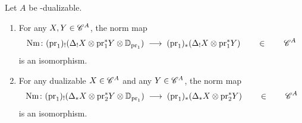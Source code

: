 \documentclass[english,svgnames,table]{article}
\begin{document}
    \begin{lemma}
    \label{lem:induced-tate-is-zero}
        Let $A$ be \COB-dualizable.
        \begin{enumerate}[label=(\arabic*)]
            \item \label{item:induced-tate-pr1}
            For any $X, Y \in \mathscr{C}^A$, the norm map
            \begin{equation*}
                \operatorname{Nm} \colon (\mathrm{pr}_1)_! (\Delta_! X \otimes \mathrm{pr}_1^* Y \otimes \mathbb{D}_{\mathrm{pr}_1}) \;\longrightarrow\; (\mathrm{pr}_1)_* (\Delta_! X \otimes \mathrm{pr}_1^* Y) \qquad \in \qquad \mathscr{C}^{A}
            \end{equation*}
            is an isomorphism.
            \item \label{item:induced-tate-pr2}
            For any dualizable $X \in \mathscr{C}^A$ and any $Y \in \mathscr{C}^A$, the norm map
            \begin{equation*}
                \operatorname{Nm} \colon (\mathrm{pr}_1)_! (\Delta_* X \otimes \mathrm{pr}_2^* Y \otimes \mathbb{D}_{\mathrm{pr}_1}) \;\longrightarrow\; (\mathrm{pr}_1)_* (\Delta_* X \otimes \mathrm{pr}_2^* Y) \qquad \in \qquad \mathscr{C}^{A}
            \end{equation*}
            is an isomorphism.
        \end{enumerate}
    \end{lemma}
\end{document}
